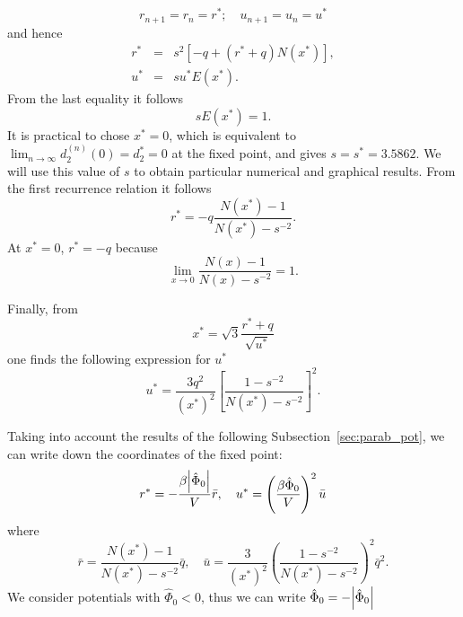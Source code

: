 \begin{equation*}
	r_{n+1} = r_n = r^*; \quad u_{n+1} = u_n = u^*
\end{equation*}
and hence
\begin{eqnarray*}
	r^* & = & s^2[-q + (r^* + q)N(x^*)],
	\nonumber \\
	u^* & = & s u^* E(x^*).
\end{eqnarray*}
From the last equality it follows
\begin{equation}
	sE(x^*) = 1.
\end{equation}
It is practical to chose $x^* = 0$, which is equivalent to $\lim_{n \to \infty}d_2^{(n)}(0) = d_2^* = 0$ at the fixed point, and gives $s = s^* = 3.5862$. We will use this value of $s$ to obtain particular numerical and graphical results. From the first recurrence relation it follows
\begin{equation*}
	r^* = -q\frac{N(x^*) - 1}{N(x^*) - s^{-2}}.
\end{equation*}
At $x^* = 0$, $r^* = -q$ because 
$$
\lim_{x \to 0} \frac{N(x) -1}{N(x) - s^{-2}} = 1.
$$ 

Finally, from 
\begin{equation*}
	x^* = \sqrt{3} \frac{r^* + q}{\sqrt{u^*}}
\end{equation*}
one finds the following expression for $u^*$
\begin{equation*}
	u^* = \frac{3 q^2}{(x^*)^2} \left[\frac{1 - s^{-2}}{N(x^*) - s^{-2}}\right]^2.
\end{equation*}

Taking into account the results of the following Subsection~\ref{sec:parab_pot}, we can write down the coordinates of the fixed point:
\begin{equation}
	r^* = - {\frac{\beta \abs{\hat{\Phi}_0}}{V}} \bar{r}, 
	\quad 
	u^* = \left(\frac{\beta \hat{\Phi}_0}{V}\right)^2 \bar{u}
\end{equation}
where
\begin{equation*}
	\bar{r} = \frac{N(x^*) - 1}{N(x^*) - s^{-2}} \bar{q}, 
	\quad 
	\bar{u} = \frac{3}{(x^*)^2} \left(\frac{1 - s^{-2}}{N(x^*) - s^{-2}}\right)^2 \bar{q}^2.
\end{equation*}
We consider potentials with $\hat{\Phi}_0 < 0$, thus we can write $\hat{\Phi}_0 = -\abs{\hat{\Phi}_0}$

